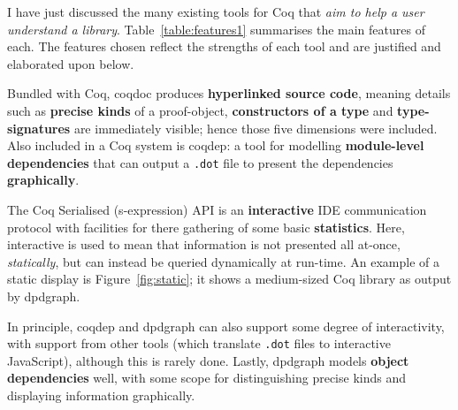 I have just discussed the many existing tools for Coq that \emph{aim to help a
user understand a library}. Table~\ref{table:features1} summarises the main
features of each. The features chosen reflect the strengths of each tool
and are justified and elaborated upon below. 

Bundled with Coq, coqdoc produces \textbf{hyperlinked source code}, meaning
details such as \textbf{precise kinds} of a proof-object, \textbf{constructors
of a type} and \textbf{type-signatures} are immediately visible; hence those
five dimensions were included.  Also included in a Coq system is coqdep: a tool
for modelling \textbf{module-level dependencies} that can output a \texttt{.dot}
file to present the dependencies \textbf{graphically}.

The Coq Serialised (s-expression) API is an \textbf{interactive} IDE communication
protocol with facilities for there gathering of some basic \textbf{statistics}. Here,
interactive is used to mean that information is not presented all at-once,
\emph{statically}, but can instead be queried dynamically at run-time. An
example of a static display is Figure~\ref{fig:static}; it shows a medium-sized
Coq library as output by dpdgraph.

In principle, coqdep and dpdgraph can also support some degree of interactivity,
with support from other tools (which translate \texttt{.dot} files to
interactive JavaScript), although this is rarely done.  Lastly, dpdgraph models
\textbf{object dependencies} well, with some scope for distinguishing precise
kinds and displaying information graphically.

